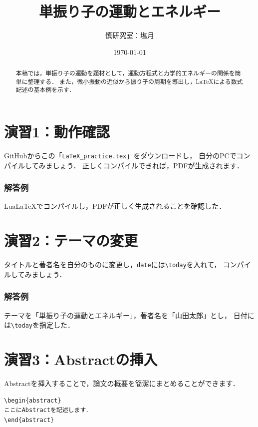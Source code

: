 \documentclass[a4paper,twocolumn]{ltjsarticle}
\title{%
単振り子の運動とエネルギー
}
\author{慎研究室：塩月}
\date{\today}
\begin{document}
\maketitle

\begin{abstract}
本稿では，単振り子の運動を題材として，運動方程式と力学的エネルギーの関係を簡単に整理する．
また，微小振動の近似から振り子の周期を導出し，LaTeXによる数式記述の基本例を示す．
\end{abstract}

\section*{演習1：動作確認}
GitHubからこの「\texttt{LaTeX\_practice.tex}」をダウンロードし，
自分のPCでコンパイルしてみましょう．
正しくコンパイルできれば，PDFが生成されます．

\subsubsection*{解答例}
LuaLaTeXでコンパイルし，PDFが正しく生成されることを確認した．

\section*{演習2：テーマの変更}
タイトルと著者名を自分のものに変更し，\texttt{date}には\verb|\today|を入れて，
コンパイルしてみましょう．

\subsubsection*{解答例}
テーマを「単振り子の運動とエネルギー」，著者名を「山田太郎」とし，
日付には\verb|\today|を指定した．

\section*{演習3：Abstractの挿入}
Abstractを挿入することで，論文の概要を簡潔にまとめることができます．

\begin{verbatim}
\begin{abstract}
ここにAbstractを記述します．
\end{abstract}
\end{verbatim}
\end{document}
